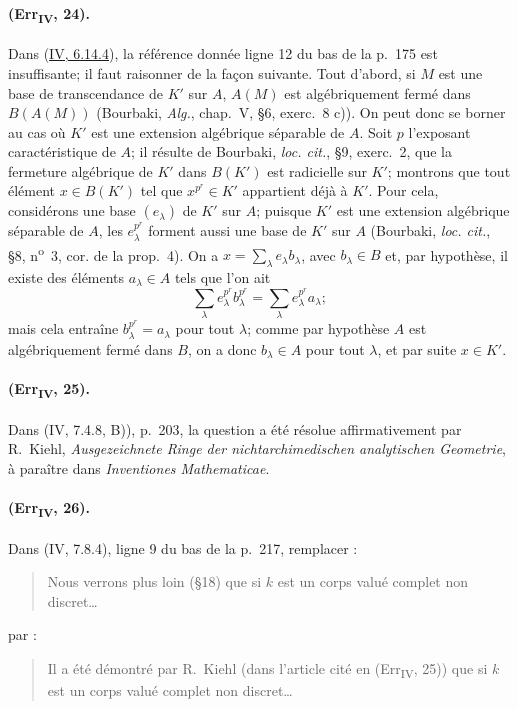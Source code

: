 \paragraph{(Err\textsubscript{IV}, 24).}
Dans ({\hyperlink{ega4.c04.prop.6-14-4}{IV, 6.14.4}}), la référence
donnée ligne 12 du bas de la p.~175 est insuffisante; il faut raisonner
de la façon suivante. Tout d'abord, si $M$ est une base de transcendance
de $K'$ sur $A$, $A(M)$ est algébriquement fermé dans $B(A(M))$
(Bourbaki, \emph{Alg.}, chap.~V, \S6, exerc.~8 c)). On peut donc se
borner au cas où $K'$ est une extension algébrique séparable de $A$.
Soit $p$ l'exposant caractéristique de $A$; il résulte de Bourbaki,
\emph{loc. cit.}, \S9, exerc.~2, que la fermeture algébrique de $K'$
dans $B(K')$ est radicielle sur $K'$; montrons que tout élément
$x\in B(K')$ tel que $x^{p^r}\in K'$ appartient déjà à $K'$. Pour cela,
considérons une base $(e_\lambda)$ de $K'$ sur $A$; puisque $K'$ est une
extension algébrique séparable de $A$, les $e_\lambda^{p^r}$ forment
aussi une base de $K'$ sur $A$ (Bourbaki, \emph{loc. cit.}, \S8,
n\textsuperscript{o}~3, cor. de la prop.~4). On a
$x=\sum_\lambda e_\lambda b_\lambda$, avec $b_\lambda\in B$ et, par
hypothèse, il existe des éléments $a_\lambda\in A$ tels que l'on ait
\[
 \sum_\lambda e_\lambda^{p^r}b_\lambda^{p^r}=
 \sum_\lambda e_\lambda^{p^r}a_\lambda;
\]
mais cela entraîne $b_\lambda^{p^r}=a_\lambda$ pour tout $\lambda$;
comme par hypothèse $A$ est algébriquement fermé dans $B$, on a donc
$b_\lambda\in A$ pour tout $\lambda$, et par suite $x\in K'$.

\paragraph{(Err\textsubscript{IV}, 25).}
Dans (IV, 7.4.8, B)), p.~203, la question a été résolue affirmativement
par R.~Kiehl, \emph{Ausgezeichnete Ringe der nichtarchimedischen
analytischen Geometrie}, à paraître dans \emph{Inventiones
Mathematicae}.

\paragraph{(Err\textsubscript{IV}, 26).}
Dans (IV, 7.8.4), ligne 9 du bas de la p.~217, remplacer :
\begin{quote}
Nous verrons plus loin (\S18) que si $k$ est un corps valué complet non
discret\ldots
\end{quote}
par :
\begin{quote}
Il a été démontré par R.~Kiehl (dans l'article cité en
(Err\textsubscript{IV}, 25)) que si $k$ est un corps valué complet non
discret\ldots
\end{quote}

